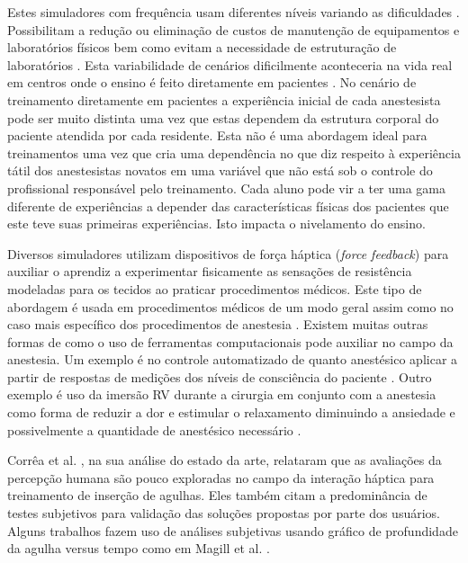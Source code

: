 Estes simuladores com frequência usam diferentes níveis variando as dificuldades \cite{Ullrich2012}. Possibilitam a redução ou eliminação de custos de manutenção de equipamentos e laboratórios físicos bem como evitam a necessidade de estruturação de laboratórios \cite{Silva2018}. 
Esta variabilidade de cenários dificilmente aconteceria na vida real em centros onde o ensino é feito diretamente em pacientes \cite{Udani2015}. No cenário de treinamento diretamente em pacientes a experiência inicial de cada anestesista pode ser muito distinta uma vez que estas dependem da estrutura corporal do paciente atendida por cada residente. Esta não é uma abordagem ideal para treinamentos uma vez que cria uma dependência no que diz respeito à experiência tátil dos anestesistas novatos em uma variável que não está sob o controle do profissional responsável pelo treinamento. Cada aluno pode vir a ter uma gama diferente de experiências a depender das características físicas dos pacientes que este teve suas primeiras experiências. Isto impacta o nivelamento do ensino.

Diversos simuladores utilizam dispositivos de força háptica (\textit{force feedback}) para auxiliar o aprendiz a experimentar fisicamente as sensações de resistência modeladas para os tecidos ao praticar procedimentos médicos. Este tipo de abordagem é usada em procedimentos médicos de um modo geral \cite{Escobar-Castillejos2016, Patel2021} assim como no caso mais específico dos procedimentos de anestesia \cite{Vaughan2013, Collaco2021}. Existem muitas outras formas de como o uso de ferramentas computacionais pode auxiliar no campo da anestesia. Um exemplo é no controle automatizado de quanto anestésico aplicar a partir de respostas de medições dos níveis de consciência do paciente \cite{Mendez2009}. Outro exemplo é uso da imersão \acrshort{RV} durante a cirurgia em conjunto com a anestesia como forma de reduzir a dor e estimular o relaxamento diminuindo a ansiedade e possivelmente a quantidade de anestésico necessário \cite{Eijlers2019}.

Corrêa et al. \cite{Correa2019}, na sua análise do estado da arte, relataram que as avaliações da percepção humana são pouco exploradas no campo da interação háptica para treinamento de inserção de agulhas. Eles também citam a predominância de testes subjetivos para validação das soluções propostas por parte dos usuários. Alguns trabalhos fazem uso de análises subjetivas usando gráfico de profundidade da agulha versus tempo como em Magill et al. \cite{Magill2010}. 

